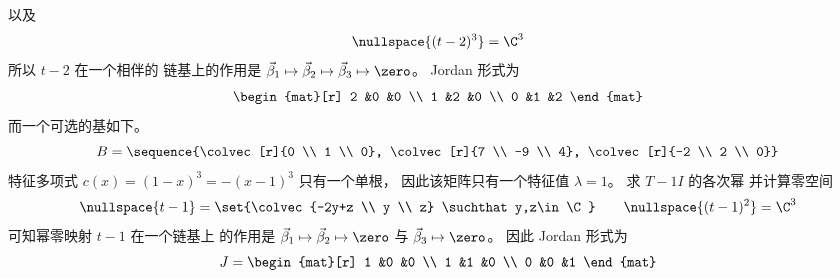 \begin{exercises}
\begin{answer}
\begin{exparts}
            以及
            \begin{equation*} 
              \nullspace{(t-2)^3}=\C^3
            \end{equation*}
            所以
            $t-2$ 在一个相伴的
            链基上的作用是
            $\vec{\beta}_1\mapsto\vec{\beta}_2\mapsto
                   \vec{\beta}_3\mapsto\zero$。
            Jordan 形式为
            \begin{equation*}
                  \begin{mat}[r]
                    2  &0  &0  \\
                    1  &2  &0  \\
                    0  &1  &2
                  \end{mat}
            \end{equation*}
            而一个可选的基如下。
            \begin{equation*}
              B=\sequence{\colvec[r]{0 \\ 1 \\ 0},
                          \colvec[r]{7 \\ -9 \\ 4},
                          \colvec[r]{-2 \\ 2 \\ 0}}
            \end{equation*}
        \partsitem 特征多项式
            \( c(x)=(1-x)^3=-(x-1)^3 \) 只有一个单根，
            因此该矩阵只有一个特征值 $\lambda=1$。
            求 $T-1I$ 的各次幂
            并计算零空间
            \begin{equation*}
               \nullspace{t-1}=\set{\colvec{-2y+z \\ y \\ z}
                                      \suchthat y,z\in\C} 
               \qquad
               \nullspace{(t-1)^2}=\C^3 
            \end{equation*}
            可知幂零映射 $t-1$ 在一个链基上
            的作用是
            $\vec{\beta}_1\mapsto\vec{\beta}_2\mapsto\zero$ 与
            $\vec{\beta}_3\mapsto\zero$。
            因此 Jordan 形式为
            \begin{equation*}
                  J=
                  \begin{mat}[r]
                    1  &0  &0  \\
                    1  &1  &0  \\
                    0  &0  &1
                  \end{mat}

\end{equation*}
\end{exparts}
\end{answer}
\end{exercises}
